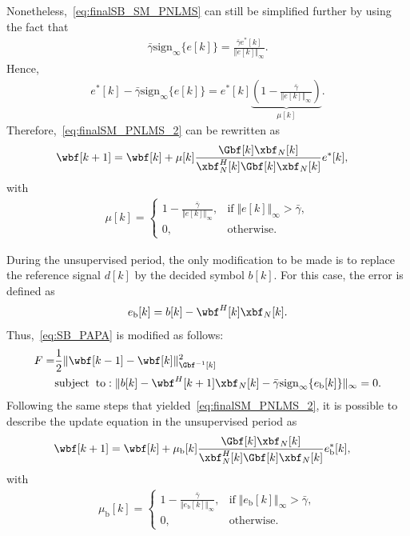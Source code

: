 Nonetheless,~\eqref{eq:finalSB_SM_PNLMS} can still be simplified further by using the fact that
\begin{align}
	\bar{\gamma}\mathrm{sign}_{\infty}\{e[k]\} = \frac{\bar{\gamma}e^*[k]}{\Vert e[k] \Vert_\infty}.
\end{align}
Hence,
\begin{align}
	e^*[k] - \bar{\gamma}\mathrm{sign}_{\infty}\{e[k]\} = e^*[k]\underbrace{\left(1 - \frac{\bar{\gamma}}{\Vert e[k]\Vert_\infty} \right)}_{\mu[k]}.
\end{align}
Therefore,~\eqref{eq:finalSM_PNLMS_2} can be rewritten as
\begin{align}\label{eq:finalSM_PNLMS_3}
	\wbf[k+1] &= \wbf[k]+ \mu[k]\frac{\Gbf[k]\xbf_N[k]}{\xbf_N^H[k]\Gbf[k]\xbf_N[k]}e^*[k],
\end{align}
with
\begin{align}
	\mu[k] = \begin{cases}
	         	1 - \frac{\bar{\gamma}}{\Vert e[k]\Vert_\infty}, \!\!\!\!&\mathrm{if\;} \Vert e[k]\Vert_\infty > \bar{\gamma},\\
			0, & \mathrm{otherwise}.
	         \end{cases}
\end{align}

During the unsupervised period, the only modification to be made is to replace the reference signal $d[k]$ by the decided symbol $b[k]$. For this case, the error is defined as
\begin{align}
	e_\mathrm{b}[k] = b[k] - \wbf^H[k]\xbf_N[k].
\end{align}
Thus,~\eqref{eq:SB_PAPA} is modified as follows:
\begin{align}\label{eq:SB_PAPA_2}
	\begin{split}
		F = &\frac{1}{2}\Vert \wbf[k-1] - \wbf[k] \Vert_{\Gbf^{-1}[k]}^2\\
		&\mathrm{subject\;\;to:\;} \Vert b[k] - \wbf^H[k+1]\xbf_N[k]- \bar{\gamma}\mathrm{sign}_{\infty}\{e_\mathrm{b}[k]\}\Vert_\infty = 0.
	\end{split}
\end{align}
Following the same steps that yielded~\eqref{eq:finalSM_PNLMS_2}, it is possible to describe the update equation in the unsupervised period as
\begin{align}
	\wbf[k+1] &= \wbf[k]+ \mu_\mathrm{b}[k]\frac{\Gbf[k]\xbf_N[k]}{\xbf_N^H[k]\Gbf[k]\xbf_N[k]}e_\mathrm{b}^*[k],
\end{align}
with
\begin{align}
	\mu_\mathrm{b}[k] = \begin{cases}
	         	1 - \frac{\bar{\gamma}}{\Vert e_\mathrm{b}[k]\Vert_\infty}, \!\!\!\!&\mathrm{if\;} \Vert e_\mathrm{b}[k]\Vert_\infty > \bar{\gamma},\\
			0, & \mathrm{otherwise}.
	         \end{cases}
\end{align}


